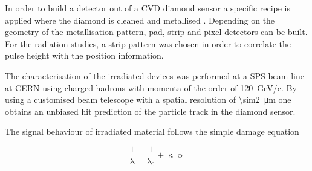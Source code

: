 In order to build a detector out of a \ac{CVD} diamond sensor a specific recipe is applied where the diamond is cleaned and metallised \cite{kagan}. Depending on the geometry of the metallisation pattern, pad, strip and pixel detectors can be built. For the radiation studies, a strip pattern was chosen in order to correlate the pulse height with the position information.\par
The characterisation of the irradiated devices was performed at a \ac{SPS} beam line at CERN using charged hadrons with momenta of the order of \SI{120}{\giga\electronvolt/c}. By using a customised beam telescope with a spatial resolution of \SI{\sim2}{\micro\meter} one obtains an unbiased hit prediction of the particle track in the diamond sensor.\par
The signal behaviour of irradiated material follows the simple damage equation

\begin{equation}
	\frac{1}{\uplambda} = \frac{1}{\uplambda_0} + \upkappa\upphi \label{erad}
\end{equation}

